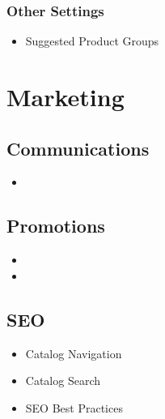 \documentclass[letterpaper,10pt,english]{sphinxmanual}
\begin{document}
\subsubsection{Other Settings}
\label{\detokenize{product/user-guide/README:other-settings}}\begin{itemize}
\item {} 
Suggested Product Groups

\end{itemize}


\section{Marketing}
\label{\detokenize{product/user-guide/README:marketing}}

\subsection{Communications}
\label{\detokenize{product/user-guide/README:communications}}\begin{itemize}
\item {} 

\end{itemize}


\subsection{Promotions}
\label{\detokenize{product/user-guide/README:promotions}}\begin{itemize}
\item {} 

\item {} 

\end{itemize}


\subsection{SEO}
\label{\detokenize{product/user-guide/README:seo}}\begin{itemize}
\item {} 
Catalog Navigation

\item {} 
Catalog Search

\item {} 
SEO Best Practices

\end{itemize}
\end{document}
